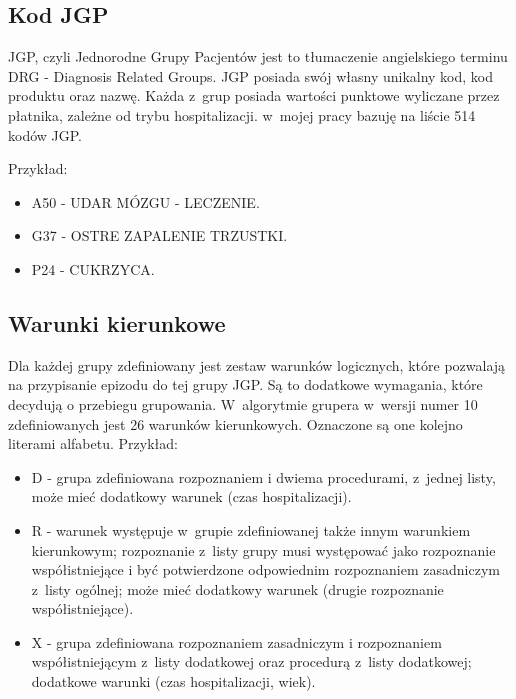 
\subsection{Kod JGP}
\label{sec:kodJGP}

JGP, czyli Jednorodne Grupy Pacjentów jest to tłumaczenie angielskiego terminu DRG - Diagnosis Related Groups.
JGP posiada swój własny unikalny kod, kod produktu oraz nazwę. Każda z~grup posiada wartości punktowe wyliczane przez płatnika, zależne od trybu hospitalizacji. w~mojej pracy bazuję na liście 514 kodów JGP.

Przykład:
\begin{itemize}
\item A50 - UDAR MÓZGU - LECZENIE.
\item G37 - OSTRE ZAPALENIE TRZUSTKI.
\item P24 - CUKRZYCA.
\end{itemize}


\subsection{Warunki kierunkowe}
\label{sec:warunkiKierunkowe}

Dla każdej grupy zdefiniowany jest zestaw warunków logicznych, które pozwalają na przypisanie epizodu do tej grupy JGP. Są to dodatkowe wymagania, które decydują o przebiegu grupowania. W~algorytmie grupera w~wersji numer 10 zdefiniowanych jest 26 warunków kierunkowych. Oznaczone są one kolejno literami alfabetu.
Przykład:
\begin{itemize}
\item D - grupa zdefiniowana rozpoznaniem i dwiema procedurami, z~jednej listy, może mieć dodatkowy warunek (czas hospitalizacji).
\item R - warunek występuje w~grupie zdefiniowanej także innym warunkiem kierunkowym; rozpoznanie z~listy grupy musi występować jako rozpoznanie współistniejące i być potwierdzone odpowiednim rozpoznaniem zasadniczym z~listy ogólnej; może mieć dodatkowy warunek (drugie rozpoznanie współistniejące).
\item X - grupa zdefiniowana rozpoznaniem zasadniczym i rozpoznaniem współistniejącym z~listy dodatkowej oraz procedurą z~listy dodatkowej; dodatkowe warunki (czas hospitalizacji, wiek).
\end{itemize}

